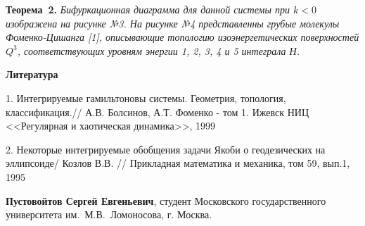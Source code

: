 \textbf{Теорема~2.} {\it Бифуркационная диаграмма для данной системы при $k<0$ изображена на рисунке №3. На рисунке №4 представленны грубые молекулы Фоменко-Цишанга [1], описывающие топологию изоэнергетических поверхностей $Q^3$, соответствующих уровням энергии 1, 2, 3, 4 и 5 интеграла Н.
}

\smallskip \centerline{\bf Литература}\nopagebreak

1. Интегрируемые гамильтоновы системы. Геометрия, топология, классификация.// 	А.В. Болсинов, А.Т. Фоменко - том 1. Ижевск НИЦ	<<Регулярная и хаотическая динамика>>, 1999

2. Некоторые интегрируемые обобщения задачи Якоби о геодезических на эллипсоиде/  Козлов В.В. // Прикладная математика и механика, том 59, вып.1, 1995

{\bf Пустовойтов Сергей Евгеньевич}, студент Московского государственного университета им.~М.В.~Ломоносова, г. Москва.

